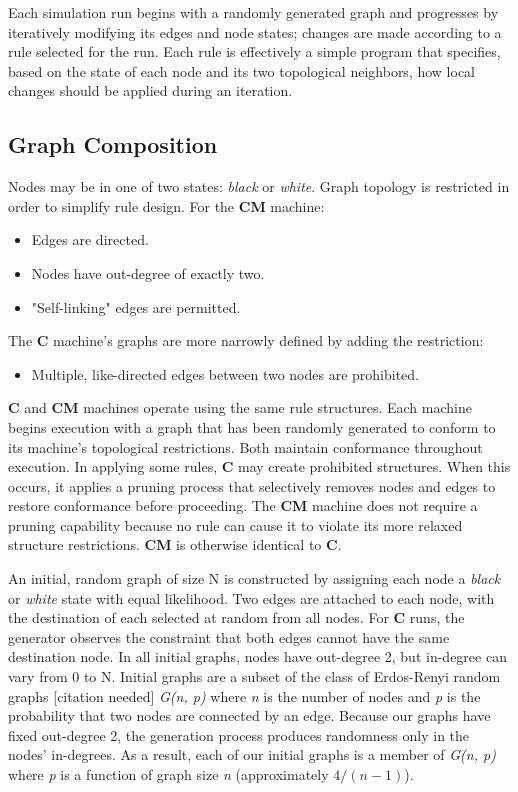 \documentclass[twoside,twocolumn]{article}
\begin{document}
Each simulation run begins with a randomly generated graph and progresses by
iteratively modifying its edges and node states; changes are made according to a rule selected
for the run. Each rule is effectively a simple program  that specifies, based on the state
of each node and its two topological neighbors, how local changes should be applied during an
iteration.

\subsection{Graph Composition}

Nodes may be in one of two states: \textit{black} or \textit{white}.
Graph topology is restricted in order to simplify rule design. For the
\textbf{CM} machine:

\begin{itemize}
    \item Edges are directed.
    \item Nodes have out-degree of exactly two.
    \item "Self-linking" edges are permitted.
\end{itemize}
The \textbf{C}  machine's graphs are more narrowly defined by adding the
restriction:
\begin{itemize} 
    \item Multiple, like-directed edges between two nodes are prohibited.
\end{itemize}

\textbf{C} and \textbf{CM} machines operate using the same rule structures.
Each machine begins execution with a graph that has been randomly generated
to conform to its machine's topological restrictions. Both maintain conformance
throughout execution. In applying some rules, \textbf{C} may create prohibited
structures. When this occurs, it applies a pruning process that selectively
removes nodes and edges to restore conformance before proceeding. The \textbf{CM}
machine does not require a pruning capability because no rule can cause it to
violate its more relaxed structure restrictions. \textbf{CM} is otherwise
identical to \textbf{C}.  

An initial, random graph of size N is constructed by assigning each node
a \textit{black} or \textit{white} state with equal likelihood.
Two edges are attached to each node, with
the destination of each selected at random from all nodes. For \textbf{C} runs, the
generator observes the constraint that both edges cannot have the same destination node.
In all initial graphs, nodes have out-degree 2, but in-degree can vary from 0 to N.
Initial graphs are a subset of the class of Erdos-Renyi random graphs [citation needed]
\textit{G(n, p)} where \textit{n} is the number of nodes and \textit{p} is the probability
that two nodes are connected by an edge. Because our graphs have fixed out-degree 2,
the generation process produces randomness only in the nodes' in-degrees. As a result,
each of our initial graphs is a member of \textit{G(n, p)} where \textit{p} is a function
of graph size \textit{n} (approximately \( 4 / (n - 1) \)).
\end{document}
